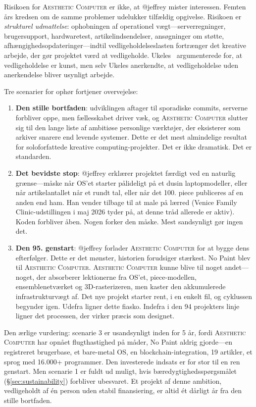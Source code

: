 \documentclass[10pt,letterpaper,twocolumn]{article}
\newcommand{\ac}{\textsc{Aesthetic Computer}}
\begin{document}
Risikoen for \ac{} er ikke, at @jeffrey mister interessen. Femten års kredsen om de samme problemer udelukker tilfældig opgivelse. Risikoen er \emph{strukturel udmattelse}: ophobningen af operationel vægt---serverregninger, brugersupport, hardwaretest, artikelindsendelser, ansøgninger om støtte, afhængighedsopdateringer---indtil vedligeholdelseslasten fortrænger det kreative arbejde, der gør projektet værd at vedligeholde. Ukeles~\citep{ukeles1969manifesto} argumenterede for, at vedligeholdelse er kunst, men selv Ukeles anerkendte, at vedligeholdelse uden anerkendelse bliver usynligt arbejde.

Tre scenarier for ophør fortjener overvejelse:

\begin{enumerate}
  \item \textbf{Den stille bortfaden}: udviklingen aftager til sporadiske commits, serverne forbliver oppe, men fællesskabet driver væk, og \ac{} slutter sig til den lange liste af ambitiøse personlige værktøjer, der eksisterer som arkiver snarere end levende systemer. Dette er det mest almindelige resultat for soloforfattede kreative computing-projekter. Det er ikke dramatisk. Det er standarden.

  \item \textbf{Det bevidste stop}: @jeffrey erklærer projektet færdigt ved en naturlig grænse---måske når OS'et starter pålideligt på et dusin laptopmodeller, eller når artikelantallet når et rundt tal, eller når det 100. piece publiceres af en anden end ham. Han vender tilbage til at male på lærred (Venice Family Clinic-udstillingen i maj 2026 tyder på, at denne tråd allerede er aktiv). Koden forbliver åben. Nogen forker den måske. Mest sandsynligt gør ingen det.

  \item \textbf{Den 95. genstart}: @jeffrey forlader \ac{} for at bygge dens efterfølger. Dette er det mønster, historien forudsiger stærkest. No Paint blev til \ac{}. \ac{} kunne blive til noget andet---noget, der absorberer lektionerne fra OS'et, piece-modellen, ensemblenetværket og 3D-rasterizeren, men kaster den akkumulerede infrastrukturvægt af. Det nye projekt starter rent, i en enkelt fil, og cyklussen begynder igen. Udefra ligner dette fiasko. Indefra i den 94 projekters linje ligner det processen, der virker præcis som designet.
\end{enumerate}

Den ærlige vurdering: scenarie 3 er usandsynligt inden for 5 år, fordi \ac{} har opnået flugthastighed på måder, No Paint aldrig gjorde---en registreret brugerbase, et bare-metal OS, en blockchain-integration, 19 artikler, et sprog med 16.000+ programmer. Den investerede indsats er for stor til en ren genstart. Men scenarie 1 er fuldt ud muligt, hvis bæredygtighedsspørgsmålet (\S\ref{sec:sustainability}) forbliver ubesvaret. Et projekt af denne ambition, vedligeholdt af én person uden stabil finansiering, er altid ét dårligt år fra den stille bortfaden.
\end{document}
